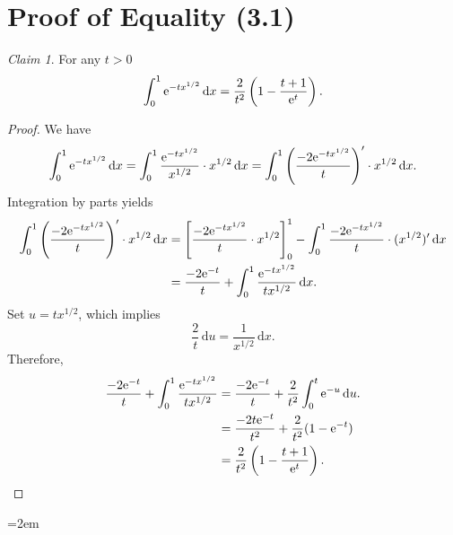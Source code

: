 \documentclass[10pt,a4paper,twoside]{book}
\newcommand{\dx}{\,\mathrm{d} x}
\newcommand{\du}{\,\mathrm{d} u}
\newcommand{\ex}{{\rm e}}
\theoremstyle{definition}
\theoremstyle{remark}
\newtheorem*{claim*}{Claim}
\begin{document}
\section{Proof of Equality (3.1)} \label{app:integral}
\begin{claim*}
For any $t>0$
\[     
\int_{0}^{1} \ex^{-t x^{1/2}} \dx = \frac{2}{t^2}\left(1 - \frac{t + 1}{\ex ^t} \right). 
\]
\end{claim*}
\begin{proof}
We have
\[ \int_{0}^{1} \ex^{-t x^{1/2}} \dx = \int_{0}^{1} \frac{\ex^{-t x^{1/2}}}{x^{1/2}} \cdot x^{1/2} \dx = \int_{0}^{1} \left( \frac{-2 \ex^{-t x^{1/2}}}{t} \right)' \cdot x^{1/2} \dx. \]
Integration by parts yields
\begin{align*}
\int_{0}^{1} \left( \frac{-2 \ex^{-t x^{1/2}}}{t} \right)' \cdot x^{1/2} \dx &= \left[ \frac{-2 \ex^{-t x^{1/2}}}{t} \cdot x^{1/2} \right]_0^1 - \int_{0}^{1} \frac{-2 \ex^{-t x^{1/2}}}{t} \cdot (x^{1/2})' \dx \\
&= \frac{-2 \ex^{-t}}{t} + \int_{0}^{1} \frac{\ex^{-t x^{1/2}}}{tx^{1/2}} \dx.
\end{align*}
Set $u = tx^{1/2}$, which implies 
\[\frac{2}{t} \du = \frac{1}{x^{1/2}} \dx. \]
Therefore,
\begin{align*}
\frac{-2 \ex^{-t}}{t} + \int_{0}^{1} \frac{\ex^{-t x^{1/2}}}{tx^{1/2}} &= \frac{-2 \ex^{-t}}{t} + \frac{2}{t^2} \int_{0}^{t} \ex^{-u} \du. \\
&= \frac{-2t \ex^{-t}}{t^2} + \frac{2}{t^2} (1 - \ex^{-t}) \\
&= \frac{2}{t^2}\left(1 - \frac{t + 1}{\ex ^t} \right). \qedhere
\end{align*}
\end{proof}

\clearpage
\thispagestyle{empty}
\emergencystretch=2em
\printbibliography[heading=bibintoc,title={Bibliography}]
%
%
\end{document}

